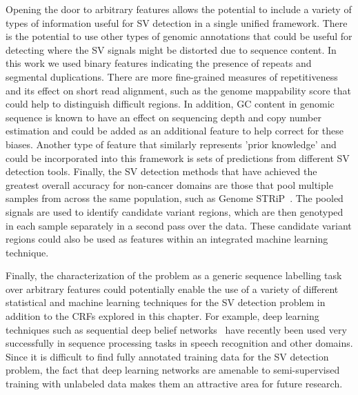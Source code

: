 Opening the door to arbitrary features allows the potential to include a variety of types of information useful for SV detection in a single unified framework. There is the potential to use other types of genomic annotations that could be useful for detecting where the SV signals might be distorted due to sequence content. In this work we used binary features indicating the presence of repeats and segmental duplications. There are more fine-grained measures of repetitiveness and its effect on short read alignment, such as the genome mappability score \cite{Lee:2012bk} that could help to distinguish difficult regions. In addition, GC content in genomic sequence is known to have an effect on sequencing depth and copy number estimation \cite{Benjamini:2012er} and could be added as an additional feature to help correct for these biases. Another type of feature that similarly represents 'prior knowledge' and could be incorporated into this framework is sets of predictions from different SV detection tools. Finally, the SV detection methods that have achieved the greatest overall accuracy for non-cancer domains are those that pool multiple samples from across the same population, such as Genome STRiP~\cite{Handsaker:2011ki}. The pooled signals are used to identify candidate variant regions, which are then genotyped in each sample separately in a second pass over the data. These candidate variant regions could also be used as features within an integrated machine learning technique.

Finally, the characterization of the problem as a generic sequence labelling task over arbitrary features could potentially enable the use of a variety of different statistical and machine learning techniques for the SV detection problem in addition to the CRFs explored in this chapter. For example, deep learning techniques such as sequential deep belief networks~\cite{andrew2012:sdbn} have recently been used very successfully in sequence processing tasks in speech recognition and other domains. Since it is difficult to find fully annotated training data for the SV detection problem, the fact that deep learning networks are amenable to semi-supervised training with unlabeled data \cite{weston2012} makes them an attractive area for future research.